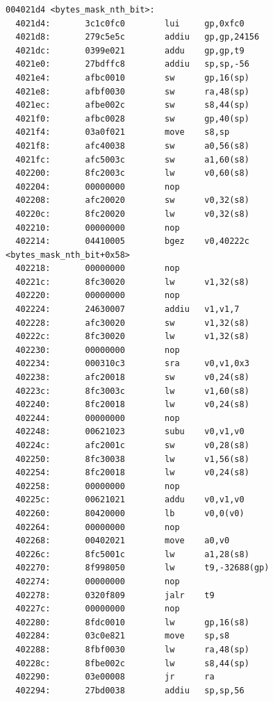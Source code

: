 \documentclass[11pt]{article}
\begin{document}
\begin{verbatim}
004021d4 <bytes_mask_nth_bit>:
  4021d4:       3c1c0fc0        lui     gp,0xfc0
  4021d8:       279c5e5c        addiu   gp,gp,24156
  4021dc:       0399e021        addu    gp,gp,t9
  4021e0:       27bdffc8        addiu   sp,sp,-56
  4021e4:       afbc0010        sw      gp,16(sp)
  4021e8:       afbf0030        sw      ra,48(sp)
  4021ec:       afbe002c        sw      s8,44(sp)
  4021f0:       afbc0028        sw      gp,40(sp)
  4021f4:       03a0f021        move    s8,sp
  4021f8:       afc40038        sw      a0,56(s8)
  4021fc:       afc5003c        sw      a1,60(s8)
  402200:       8fc2003c        lw      v0,60(s8)
  402204:       00000000        nop
  402208:       afc20020        sw      v0,32(s8)
  40220c:       8fc20020        lw      v0,32(s8)
  402210:       00000000        nop
  402214:       04410005        bgez    v0,40222c <bytes_mask_nth_bit+0x58>
  402218:       00000000        nop
  40221c:       8fc30020        lw      v1,32(s8)
  402220:       00000000        nop
  402224:       24630007        addiu   v1,v1,7
  402228:       afc30020        sw      v1,32(s8)
  40222c:       8fc30020        lw      v1,32(s8)
  402230:       00000000        nop
  402234:       000310c3        sra     v0,v1,0x3
  402238:       afc20018        sw      v0,24(s8)
  40223c:       8fc3003c        lw      v1,60(s8)
  402240:       8fc20018        lw      v0,24(s8)
  402244:       00000000        nop
  402248:       00621023        subu    v0,v1,v0
  40224c:       afc2001c        sw      v0,28(s8)
  402250:       8fc30038        lw      v1,56(s8)
  402254:       8fc20018        lw      v0,24(s8)
  402258:       00000000        nop
  40225c:       00621021        addu    v0,v1,v0
  402260:       80420000        lb      v0,0(v0)
  402264:       00000000        nop
  402268:       00402021        move    a0,v0
  40226c:       8fc5001c        lw      a1,28(s8)
  402270:       8f998050        lw      t9,-32688(gp)
  402274:       00000000        nop
  402278:       0320f809        jalr    t9
  40227c:       00000000        nop
  402280:       8fdc0010        lw      gp,16(s8)
  402284:       03c0e821        move    sp,s8
  402288:       8fbf0030        lw      ra,48(sp)
  40228c:       8fbe002c        lw      s8,44(sp)
  402290:       03e00008        jr      ra
  402294:       27bd0038        addiu   sp,sp,56


\end{verbatim}
\end{document}
